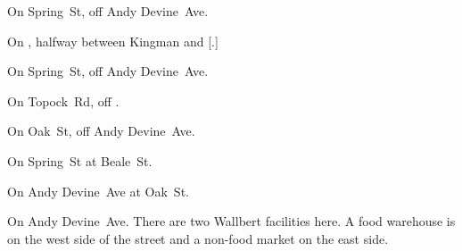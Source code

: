 
\begin{LocationList}

On Spring~St, off Andy Devine~Ave.

On , halfway between Kingman and [.]

\Location{\GasStation \Gas}
On Spring~St, off Andy Devine~Ave.

On Topock~Rd, off  .

On Oak~St, off Andy Devine~Ave.

On Spring~St at Beale~St.

\Location{\TruckService \Service \Rest}
On Andy Devine~Ave at Oak~St.

On  Andy Devine~Ave.
There are two Wallbert facilities here.
A food warehouse is on the west side of the street and a non-food market on the east side.

\end{LocationList}
